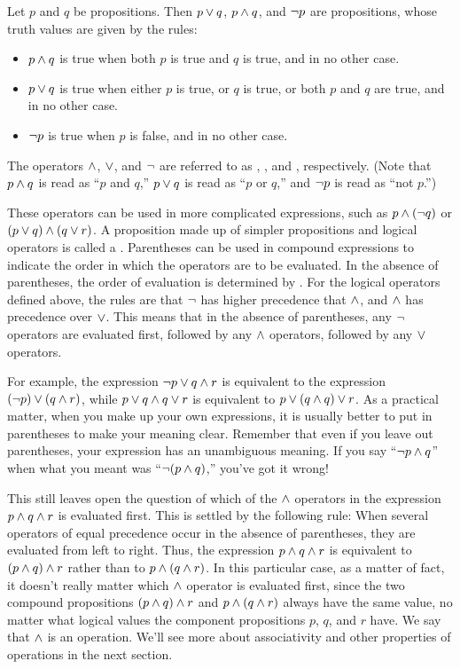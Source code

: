 \begin{definition}
Let $p$ and $q$ be propositions.  Then $p\vee q$, $p \wedge q$, and
$\lnot p$ are propositions, whose truth values are given by the
rules:
\begin{itemize}
\item $p\wedge q$ is true when both $p$ is true and $q$ is true, and in 
no other case.
\item $p\vee q$ is true when either $p$ is true, or $q$ is true, or both
$p$ and $q$ are true, and in no other case.
\item$\lnot p$ is true when $p$ is false, and in no other case.
\end{itemize}
The operators $\wedge$, $\vee$, and $\lnot$ are referred to as ,
, and , respectively.
(Note that $p\wedge q$ is read as ``$p$ and $q$,'' $p\vee q$ is read
as ``$p$ or $q$,'' and $\lnot p$ is read as ``not $p$.'')
\end{definition}


These operators can be used in more complicated expressions,
such as $p\wedge(\lnot q)$ or $(p\vee q)\wedge(q\vee r)$.  A
proposition made up of simpler propositions and logical operators
is called a .  Parentheses can be used
in compound expressions to indicate the order in which the
operators are to be evaluated.  In the absence of parentheses,
the order of evaluation is determined by .
For the logical operators defined above, the rules are that
$\lnot$ has higher precedence that $\wedge$, and $\wedge$ has precedence
over $\vee$.  This means that in the absence of parentheses,
any $\lnot$ operators are evaluated first, followed by any
$\wedge$ operators, followed by any $\vee$ operators.

For example, the expression $\lnot p \vee q \wedge r$ is
equivalent to the expression $(\lnot p)\vee (q\wedge r)$,
while $p\vee q \wedge q \vee r$ is equivalent to
$p \vee (q \wedge q) \vee r$.  As a practical matter, when you make
up your own expressions, it is usually better to put in parentheses
to make your meaning clear.  Remember that even if you leave out
parentheses, your expression has an unambiguous meaning.
If you say ``$\lnot p \wedge q$'' when what you meant was
``$\lnot (p\wedge q)$,'' you've got it wrong!

This still leaves open the question of which of the $\wedge$ operators
in the expression $p\wedge q \wedge r$ is evaluated first.
This is settled by the following rule:  When several operators
of equal precedence occur in the absence of parentheses, they
are evaluated from left to right.  Thus, the expression
$p\wedge q\wedge r$ is equivalent to $(p\wedge q)\wedge r$
rather than to $p\wedge(q\wedge r)$.
In this particular case, as a matter of fact, it doesn't really matter
which $\wedge$ operator is evaluated first, since 
the two compound propositions $(p\wedge q)\wedge r$ and
$p\wedge (q\wedge r)$ always have the same value,
no matter what logical values the component propositions $p$,
$q$, and $r$ have.  We say that $\wedge$ is an
 operation.  We'll see more about associativity
and other properties of operations in the next section.

